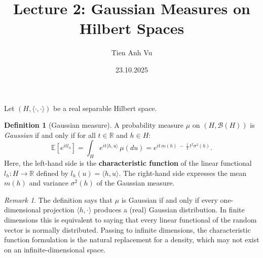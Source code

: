 \documentclass[11pt]{article}
\title{Lecture 2: Gaussian Measures on Hilbert Spaces}
\author{Tien Anh Vu}
\date{23.10.2025}
\theoremstyle{definition}
\newtheorem{definition}{Definition}
\theoremstyle{remark}
\newtheorem{remark}{Remark}
\begin{document}
\maketitle

Let $(H, \langle \cdot, \cdot \rangle)$ be a real separable Hilbert space.

\begin{definition}[Gaussian measure]
A probability measure $\mu$ on $(H, \mathcal{B}(H))$ is \emph{Gaussian} if and only if
for all $t \in \mathbb{R}$ and $h \in H$:
\[
    \mathbb{E}[e^{it l_h}] = \int_H e^{it\langle h, u \rangle} \, \mu(du)
    = e^{it \, m(h) \;-\; \frac{1}{2}\,t^2\sigma^2(h)}.
\]
Here, the left-hand side is the \textbf{characteristic function} of the linear functional $l_h \colon H \to \mathbb{R}$ defined by $l_h(u) = \langle h, u \rangle$.
The right-hand side expresses the mean $m(h)$ and variance $\sigma^2(h)$ of the Gaussian measure.
\end{definition}

\begin{remark}
The definition says that $\mu$ is Gaussian if and only if every one-dimensional projection $\langle h, \cdot \rangle$ produces a (real) Gaussian distribution.  In finite dimensions this is equivalent to saying that every linear functional of the random vector is normally distributed.  Passing to infinite dimensions, the characteristic function formulation is the natural replacement for a density, which may not exist on an infinite-dimensional space.
\end{remark}
\end{document}
